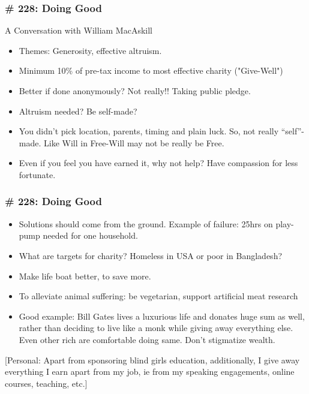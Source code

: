 \begin{frame}[fragile]
\frametitle{\# 228: Doing Good}

 A Conversation with William MacAskill

\begin{itemize}
\item Themes: Generosity, effective altruism.
\item Minimum 10\% of pre-tax income to most effective charity ("Give-Well")
\item  Better if done anonymously? Not really!! Taking public pledge.
\item  Altruism needed? Be self-made?
\item  You didn't pick location, parents, timing and plain luck. So, not really ``self''-made. Like Will in Free-Will may not be really be Free.
\item  Even if you feel you have earned it, why not help? Have compassion for less fortunate.
\end{itemize}


\end{frame}

\begin{frame}[fragile]
\frametitle{\# 228: Doing Good}


\begin{itemize}
\item Solutions should come from the ground. Example of failure: 25hrs on play-pump needed for one household.
\item  What are targets for charity? Homeless in USA or poor in Bangladesh?
\item  Make life boat better, to save more.
\item  To alleviate animal suffering: be vegetarian, support artificial meat research
\item  Good example: Bill Gates lives a luxurious life and donates huge sum as well, rather than deciding to live like a monk while giving away everything else. Even other rich are comfortable doing same. Don't stigmatize wealth.
\end{itemize}


[Personal: Apart from sponsoring blind girls education, additionally, I give away everything I earn apart from my job, ie from my speaking engagements, online courses, teaching, etc.]
\end{frame}


